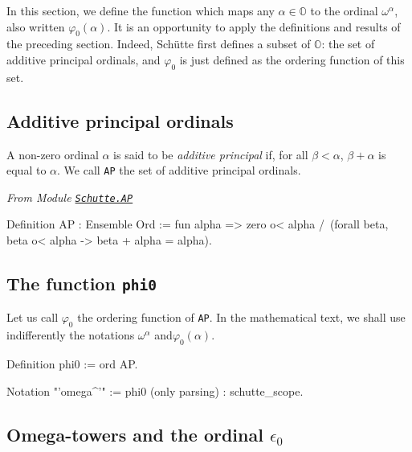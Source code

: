 {In this section, we define the function which maps any $\alpha\in\mathbb{O}$ to
the ordinal  $\omega^\alpha$, also written 
$\varphi_0(\alpha)$. 
It is an opportunity to apply the definitions and results of the preceding section. 
Indeed,  Schütte first defines a subset of $\mathbb{O}$: the set of additive principal ordinals, and $\varphi_0$  is just defined as the ordering function of this set.

\subsection{Additive principal ordinals}


\begin{definition}
A non-zero ordinal  $\alpha$ is said to be \emph{additive principal} if, for all  $\beta<\alpha$, $\beta+\alpha$ is equal to  $\alpha$.
We call \texttt{AP} the set of additive principal ordinals.

\end{definition}



\noindent\emph{From Module \href{../src/html/hydras.Schutte.AP.html}%
{\texttt{Schutte.AP}}}

\begin{Coqsrc}
Definition AP : Ensemble Ord :=
  fun alpha => 
  zero o< alpha /\
  (forall beta, beta o< alpha ->  beta + alpha = alpha).
\end{Coqsrc}

\subsection{The function \texttt{phi0}}

Let us call  $\varphi_0$ the ordering function of \texttt{AP}.
In the mathematical text, we shall use indifferently the notations  $\omega^\alpha$ and$\varphi_0(\alpha)$. 


\begin{Coqsrc}
Definition phi0 := ord AP.

Notation "'omega^'" := phi0 (only parsing) : schutte_scope.
\end{Coqsrc}

\subsection{Omega-towers and the ordinal \texorpdfstring{$\epsilon_0$}{epsilon0}}


}
